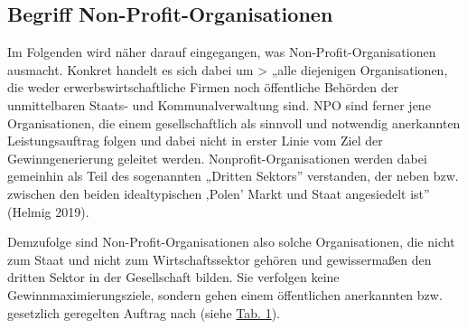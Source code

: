 \documentclass[
  letterpaper,
]{book}
\begin{document}
\subsection{Begriff Non-Profit-Organisationen}\label{begriffnpo}

Im Folgenden wird näher darauf eingegangen, was
Non-Profit-Organisationen ausmacht. Konkret handelt es sich dabei um
\textgreater{} „alle diejenigen Organisationen, die weder
erwerbswirtschaftliche Firmen noch öffentliche Behörden der
unmittelbaren Staats- und Kommunalverwaltung sind. NPO sind ferner jene
Organisationen, die einem gesellschaftlich als sinnvoll und notwendig
anerkannten Leistungsauftrag folgen und dabei nicht in erster Linie vom
Ziel der Gewinngenerierung geleitet werden. Nonprofit-Organisationen
werden dabei gemeinhin als Teil des sogenannten „Dritten Sektors''
verstanden, der neben bzw. zwischen den beiden idealtypischen ‚Polen'
Markt und Staat angesiedelt ist'' (Helmig 2019).

Demzufolge sind Non-Profit-Organisationen also solche Organisationen,
die nicht zum Staat und nicht zum Wirtschaftssektor gehören und
gewissermaßen den dritten Sektor in der Gesellschaft bilden. Sie
verfolgen keine Gewinnmaximierungsziele, sondern gehen einem
öffentlichen anerkannten bzw. gesetzlich geregelten Auftrag nach (siehe
\hyperref[table1]{Tab. 1}).
\end{document}
